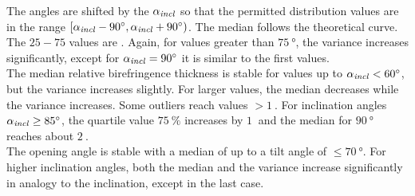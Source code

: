 The angles are shifted by the $\textnormal{$\alpha_{\mathit{incl}}$}$ so that the permitted distribution values are in the range $[\textnormal{$\alpha_{\mathit{incl}}$}-\SI{90}{\degree}, \textnormal{$\alpha_{\mathit{incl}}$}+\SI{90}{\degree})$.
The median follows the theoretical curve.
The $25-75$ values are \dummy{} .
Again, for values greater than $\SI{75}{\degree}$, the variance increases significantly, except for $\textnormal{$\alpha_{\mathit{incl}}$} = \SI{90}{\degree}$ it is similar to the first values.
\\
% 
The median relative birefringence thickness \trel{} is stable for values up to $\textnormal{$\alpha_{\mathit{incl}}$} < \SI{60}{\degree}$, but the variance increases slightly.
For larger values, the median decreases while the variance increases.
Some outliers reach values $>\SI{1}{}$.
For inclination angles $\textnormal{$\alpha_{\mathit{incl}}$} \ge \SI{85}{\degree}$, the quartile value $\SI{75}{\percent}$ increases by $\SI{1}{}$ and the median for $\SI{90}{\degree}$ reaches about $\SI{2}{}$.
\\
% 
The opening angle \modelDOmega{} is stable with a median of \dummy{} up to a tilt angle of $\le \SI{70}{\degree}$.
For higher inclination angles, both the median and the variance increase significantly in analogy to the inclination, except in the last case.
% 
% 
% 
